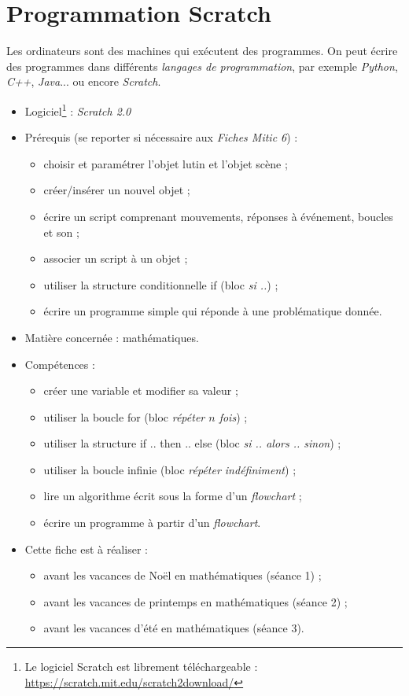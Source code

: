 \chapter{Programmation Scratch}  


Les ordinateurs sont des machines qui exécutent des programmes. On peut écrire des programmes dans différents \emph{langages de programmation}, par exemple \emph{Python}, \emph{C++}, \emph{Java}... ou encore \emph{Scratch}.



{\footnotesize
\begin{itemize}
\item Logiciel\footnote{Le logiciel Scratch est librement téléchargeable : \url{https://scratch.mit.edu/scratch2download/}} : \emph{Scratch 2.0}
\item Prérequis (se reporter si nécessaire aux \emph{Fiches Mitic 6}) : 
        \begin{itemize}
        \item choisir et paramétrer l'objet lutin et l'objet scène ;
        \item créer/insérer un nouvel objet ; 
        \item écrire un script comprenant mouvements, réponses à événement, boucles et son ;
        \item associer un script à un objet ;
        \item utiliser la structure conditionnelle if (bloc \emph{si ..}) ; 
        \item écrire un programme simple qui réponde à une problématique donnée.
        \end{itemize}
\item Matière concernée : mathématiques.
\item Compétences : 
        \begin{itemize}
        \item créer une variable et modifier sa valeur ;
        \item utiliser la boucle for (bloc \emph{répéter $n$ fois}) ;
        \item utiliser la structure if .. then .. else (bloc \emph{si .. alors .. sinon}) ; 
        \item utiliser la boucle infinie (bloc \emph{répéter indéfiniment}) ;
        \item lire un algorithme écrit sous la forme d'un \emph{flowchart} ;
        \item écrire un programme à partir d'un \emph{flowchart}.
        \end{itemize}
\item Cette fiche est à réaliser :
        \begin{itemize}
        \item avant les vacances de Noël en mathématiques (séance 1) ;
        \item avant les vacances de printemps en mathématiques (séance 2) ;
        \item avant les vacances d'été en mathématiques (séance 3). 
        \end{itemize}
\end{itemize}
} %


